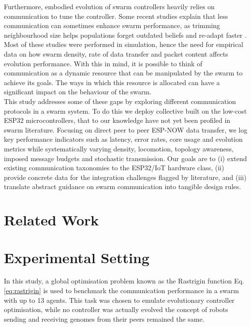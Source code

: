 \documentclass[conference]{IEEEtran}
\begin{document}
Furthermore, embodied evolution of swarm controllers heavily relies on communication to tune the controller. Some recent studies explain that less communication can sometimes enhance swarm performance, as trimming neighbourhood size helps populations forget outdated beliefs and re-adapt faster \cite{hiraga_when_2023}\cite{ding_advancements_2023}. Most of these studies were performed in simulation, hence the need for empirical data on how swarm density, rate of data transfer and packet content affects evolution performance. With this in mind, it is possible to think of communication as a dynamic resource that can be manipulated by the swarm to achieve its goals. The ways in which this resource is allocated can have a significant impact on the behaviour of the swarm.\\

This study addresses some of these gaps by exploring different communication protocols in a swarm system. To do this we deploy collective built on the low-cost ESP32 microcontrollers, that to our knowledge have not yet been profiled in swarm literature. Focusing on direct peer to peer ESP-NOW data transfer, we log key performance indicators such as latency, error rates, core usage and evolution metrics while systematically varying density, locomotion, topology awareness, imposed message budgets and stochastic transmission. Our goals are to (i) extend existing communication taxonomies to the ESP32/IoT hardware class, (ii) provide concrete data for the integration challenges flagged by literature, and (iii) translate abstract guidance on swarm communication into tangible design rules.

\section{Related Work}

\section{Experimental Setting}

In this study, a global optimisation problem known as the Rastrigin function Eq. \ref{eq:rastrigin} is used to benchmark the communication performance in a swarm with up to 13 agents. This task was chosen to emulate evolutionary controller optimisation, while no controller was actually evolved the concept of robots sending and receiving genomes from their peers remained the same.\\ 
\end{document}
